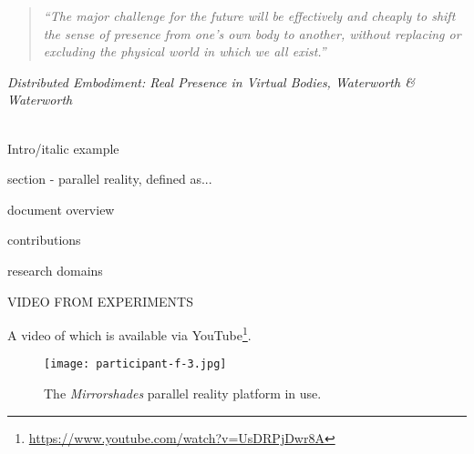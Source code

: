 \begin{quote}
	\textit{``The major challenge for the future will be effectively and cheaply to shift the sense of presence from one's own body to another, without replacing or excluding the physical world in which we all exist.''}
\end{quote}
\hfill \textit{Distributed Embodiment: Real Presence in Virtual Bodies, Waterworth \& Waterworth}
\\
\\

\label{introduction}


Intro/italic example

section - parallel reality, defined as...

document overview

contributions

research domains





















VIDEO FROM EXPERIMENTS

A video of which is available via YouTube\footnote{\url{https://www.youtube.com/watch?v=UsDRPjDwr8A}}.

\begin{figure}[h]
	\begin{center}
		\texttt{[image: participant-f-3.jpg]}
		\caption{The \textit{Mirrorshades} parallel reality platform in use.}
		\label{participant-f-3.jpg}
	\end{center}	
\end{figure}










